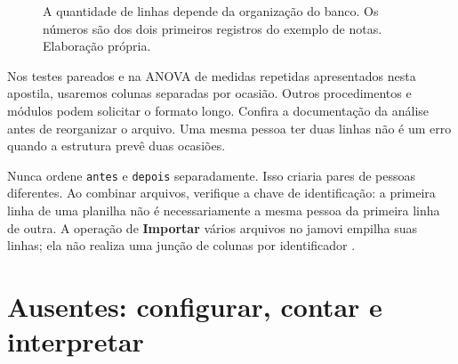 \begin{figure}[H]
\centering
{}
\caption{A quantidade de linhas depende da organização do banco. Os números são dos dois primeiros registros do exemplo de notas. Elaboração própria.}
\label{fig:formato-largo-longo}
\end{figure}

Nos testes pareados e na ANOVA de medidas repetidas apresentados nesta apostila, usaremos colunas separadas por ocasião. Outros procedimentos e módulos podem solicitar o formato longo. Confira a documentação da análise antes de reorganizar o arquivo. Uma mesma pessoa ter duas linhas não é um erro quando a estrutura prevê duas ocasiões.

Nunca ordene \texttt{antes} e \texttt{depois} separadamente. Isso criaria pares de pessoas diferentes. Ao combinar arquivos, verifique a chave de identificação: a primeira linha de uma planilha não é necessariamente a mesma pessoa da primeira linha de outra. A operação de \textbf{Importar} vários arquivos no jamovi empilha suas linhas; ela não realiza uma junção de colunas por identificador \parencite{JamoviAtualizarDados}.

\section{Ausentes: configurar, contar e interpretar}
\label{sec:ausentes-preparacao}

